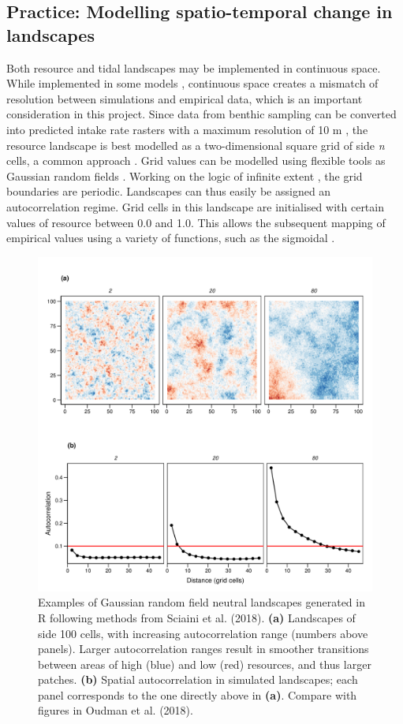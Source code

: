 \subsection{Practice: Modelling spatio-temporal change in landscapes}

Both resource and tidal landscapes may be implemented in continuous space. While implemented in some models \citep[e.g.][]{spiegel2013, spiegel2017}, continuous space creates a mismatch of resolution between simulations and empirical data, which is an important consideration in this project. Since data from benthic sampling can be converted into predicted intake rate rasters with a maximum resolution of 10 m \citetext{\citealp[see method in][]{bijleveld2012}; \citealp[examples in][]{oudman2018}}, the resource landscape is best modelled as a two-dimensional square grid of side \emph{n} cells, a common approach \citep{nolet2002, vangils2010, getz2015, netz2017}. Grid values can be modelled using flexible tools \citep{sciaini2018} as Gaussian random fields \citep{turner2015d, kery2019}. Working on the logic of infinite extent \citep{nolet2006}, the grid boundaries are periodic. Landscapes can thus easily be assigned an autocorrelation regime. Grid cells in this landscape are initialised with certain values of resource between 0.0 and 1.0. This allows the subsequent mapping of empirical values using a variety of functions, such as the sigmoidal \citep{gershenfeld1999}.

\begin{figure}

    \includegraphics[width=0.7\linewidth]{intro_essay_figure3.png}
    \caption{Examples of Gaussian random field neutral landscapes generated in R
  following methods from Sciaini et al. (2018). \textbf{(a)} Landscapes of side
  100 cells, with increasing autocorrelation range (numbers above panels).
  Larger autocorrelation ranges result in smoother transitions between
  areas of high (blue) and low (red) resources, and thus larger patches.
  \textbf{(b)} Spatial autocorrelation in simulated landscapes; each panel
  corresponds to the one directly above in \textbf{(a)}. Compare with figures
  in Oudman et al. (2018).}
    \label{fig:intro_essay_figure3}
\end{figure}

